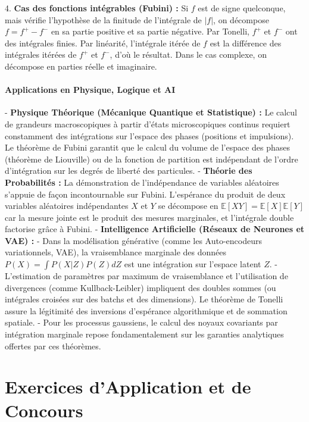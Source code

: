 \documentclass[11pt,a4paper]{article}
\begin{document}
4. \textbf{Cas des fonctions intégrables (Fubini) :}
   Si $f$ est de signe quelconque, mais vérifie l'hypothèse de la finitude de l'intégrale de $|f|$, on décompose $f = f^+ - f^-$ en sa partie positive et sa partie négative.
   Par Tonelli, $f^+$ et $f^-$ ont des intégrales finies. Par linéarité, l'intégrale itérée de $f$ est la différence des intégrales itérées de $f^+$ et $f^-$, d'où le résultat. Dans le cas complexe, on décompose en parties réelle et imaginaire.

\subsection{Applications en Physique, Logique et AI}

- \textbf{Physique Théorique (Mécanique Quantique et Statistique) :} Le calcul de grandeurs macroscopiques \`a partir d'états microscopiques continus requiert constamment des intégrations sur l'espace des phases (positions et impulsions). Le théorème de Fubini garantit que le calcul du volume de l'espace des phases (théorème de Liouville) ou de la fonction de partition est indépendant de l'ordre d'intégration sur les degrés de liberté des particules.
- \textbf{Théorie des Probabilités :} La démonstration de l'indépendance de variables aléatoires s'appuie de façon incontournable sur Fubini. L'espérance du produit de deux variables aléatoires indépendantes $X$ et $Y$ se décompose en $\mathbb{E}[XY] = \mathbb{E}[X]\mathbb{E}[Y]$ car la mesure jointe est le produit des mesures marginales, et l'intégrale double factorise grâce \`a Fubini.
- \textbf{Intelligence Artificielle (Réseaux de Neurones et VAE) :}
    - Dans la modélisation générative (comme les Auto-encodeurs variationnels, VAE), la vraisemblance marginale des données $P(X) = \int P(X|Z)P(Z) dZ$ est une intégration sur l'espace latent $Z$.
    - L'estimation de paramètres par maximum de vraisemblance et l'utilisation de divergences (comme Kullback-Leibler) impliquent des doubles sommes (ou intégrales croisées sur des batchs et des dimensions). Le théorème de Tonelli assure la légitimité des inversions d'espérance algorithmique et de sommation spatiale.
    - Pour les processus gaussiens, le calcul des noyaux covariants par intégration marginale repose fondamentalement sur les garanties analytiques offertes par ces théorèmes.


\newpage
\part{Exercices d'Application et de Concours}
\end{document}
